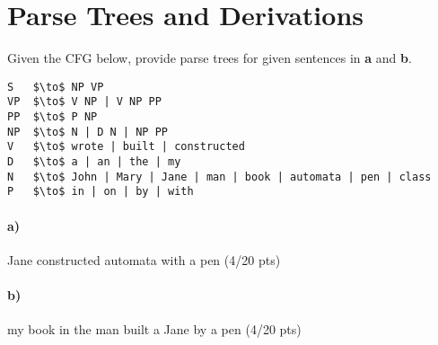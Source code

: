 \documentclass[a4paper,12pt]{article}
\begin{document}
\newpage
\section{Parse Trees and Derivations \hfill {}}
Given the CFG below, provide parse trees for given sentences in \textbf{a} and \textbf{b}.\\

\begin{lstlisting}[style=output,mathescape=true]
S   $\to$ NP VP
VP  $\to$ V NP | V NP PP
PP  $\to$ P NP
NP  $\to$ N | D N | NP PP
V   $\to$ wrote | built | constructed
D   $\to$ a | an | the | my
N   $\to$ John | Mary | Jane | man | book | automata | pen | class
P   $\to$ in | on | by | with
\end{lstlisting}

\paragraph{a)} Jane constructed automata with a pen \hfill \small{(4/20 pts)} \\

\begin{tcolorbox}

\begin{center}


\end{center}

\begin{center}


\end{center}

\end{tcolorbox}

\newpage

\paragraph{b)} my book in the man built a Jane by a pen \hfill \small{(4/20 pts)} \\
\end{document}
